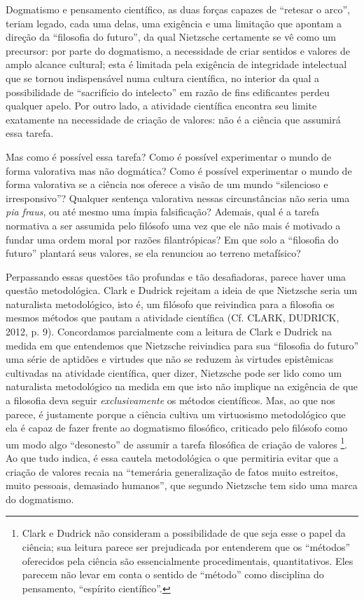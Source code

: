 \documentclass[
	12pt,				%
	openright,			%
	oneside,			%
	a4paper,			%
	english,			%
	french,				%
	spanish,			%
	brazil				%
	]{abntex2}
\begin{document}
Dogmatismo e pensamento científico, as duas forças capazes de “retesar o arco”, teriam legado, cada uma delas, uma exigência e uma limitação que apontam a direção da “filosofia do futuro”, da qual Nietzsche certamente se vê como um precursor: por parte do dogmatismo, a necessidade de criar sentidos e valores de amplo alcance cultural; esta é limitada pela exigência de integridade intelectual que se tornou indispensável numa cultura científica, no interior da qual a possibilidade de “sacrifício do intelecto” em razão de fins edificantes perdeu qualquer apelo. Por outro lado, a atividade científica encontra seu limite exatamente na necessidade de criação de valores: não é a ciência que assumirá essa tarefa.

	Mas como é possível essa tarefa? Como é possível experimentar o mundo de forma valorativa mas não dogmática? Como é possível experimentar o mundo de forma valorativa se a ciência nos oferece a visão de um mundo “silencioso e irresponsivo”? Qualquer sentença valorativa nessas circunstâncias não seria uma \textit{pia fraus}, ou até mesmo uma ímpia falsificação? Ademais, qual é a tarefa normativa a ser assumida pelo filósofo uma vez que ele não mais é motivado a fundar uma ordem moral por razões filantrópicas? Em que solo a “filosofia do futuro” plantará seus valores, se ela renunciou ao terreno metafísico? 
	
	Perpassando essas questões tão profundas e tão desafiadoras, parece haver uma questão metodológica. Clark e Dudrick rejeitam a ideia de que Nietzsche seria um naturalista metodológico, isto é, um filósofo que reivindica para a filosofia os mesmos métodos que pautam a atividade científica (Cf. CLARK, DUDRICK, 2012, p. 9). Concordamos parcialmente com a leitura de Clark e Dudrick na medida em que entendemos que Nietzsche reivindica para sua “filosofia do futuro” uma série de aptidões e virtudes que não se reduzem às virtudes epistêmicas cultivadas na atividade científica, quer dizer, Nietzsche pode ser lido como um naturalista metodológico na medida em que isto não implique na exigência de que a filosofia deva seguir \textit{exclusivamente} os métodos científicos. Mas, ao que nos parece, é justamente porque a ciência cultiva um virtuosismo metodológico que ela é capaz de fazer frente ao dogmatismo filosófico, criticado pelo filósofo como um modo algo “desonesto” de assumir a tarefa filosófica de criação de valores
\footnote{Clark e Dudrick não consideram a possibilidade de que seja esse o papel da ciência; sua leitura parece ser prejudicada por entenderem que os “métodos” oferecidos pela ciência são essencialmente procedimentais, quantitativos. Eles parecem não levar em conta o sentido de “método” como disciplina do pensamento, “espírito científico”.}. 
Ao que tudo indica, é essa cautela metodológica o que permitiria evitar que a criação de valores recaia na “temerária generalização de fatos muito estreitos, muito pessoais, demasiado humanos”, que segundo Nietzsche tem sido uma marca do dogmatismo.
\end{document}
